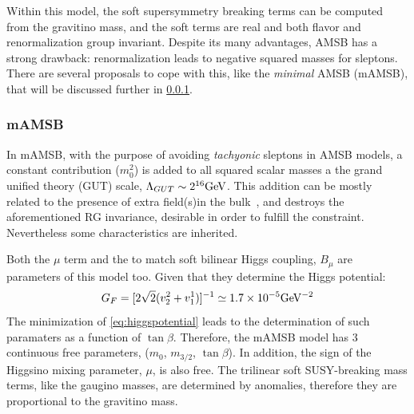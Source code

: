 Within this model, the soft supersymmetry breaking terms can be computed from the gravitino mass, and the soft terms are real and both flavor and renormalization group invariant.
Despite its many advantages, AMSB has a strong drawback: renormalization leads to negative squared masses for sleptons. There are several proposals to cope with this, like the \textit{minimal} AMSB (mAMSB), that will be discussed further in \ref{sec:mAMSB}.

\subsubsection{mAMSB}
\label{sec:mAMSB}

In mAMSB, with the purpose of avoiding \textit{tachyonic} sleptons in AMSB models, a constant contribution ($m_0^2$) is added to all squared scalar masses a the grand unified theory (GUT) scale, $\Lambda_{GUT} \sim 2 \time 10^{16} \rm GeV$. This addition can be mostly related to the presence of extra field(s)in the bulk~\cite{Datta:2001er}, and destroys the aforementioned RG invariance, desirable in order to fulfill the  constraint. Nevertheless some characteristics are inherited. 


Both the $\mu$ term and the  to match soft bilinear Higgs coupling, $B_{\mu}$ are parameters of this model too. Given that they determine the Higgs potential:
\begin{equation}
G_F = [2\sqrt{2}(v_2^2 + v_1^1)]^{-1} \simeq 1.7 \times 10^{-5} \rm GeV^{-2}
\label{eq:higgspotential}
\end{equation}
The minimization of \ref{eq:higgspotential} leads to the determination of such paramaters as a function of $\tan{\beta}$. Therefore, the mAMSB model has 3 continuous free parameters, ($m_0$, $m_{3/2}$, $\tan{\beta}$). In addition, the sign of the Higgsino mixing parameter, $\mu$,  is also free. The trilinear soft SUSY-breaking mass terms, like the gaugino masses, are determined by anomalies, therefore they are proportional to the gravitino mass.  

